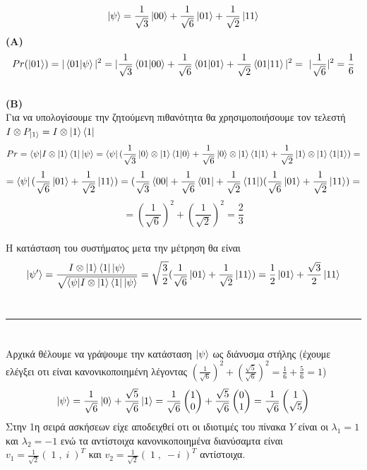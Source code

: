 \documentclass[12pt]{article}
\begin{document}
\section*{{}}
$$\ket{\psi} = \frac{1}{\sqrt{3}}\ket{00}+\frac{1}{\sqrt{6}}\ket{01}+\frac{1}{\sqrt{2}}\ket{11}$$
{\bf (A)}\\
$$Pr(\ket{01}) = |\braket{01|\psi}|^2 = |\frac{1}{\sqrt{3}}\braket{01|00}+\frac{1}{\sqrt{6}}\braket{01|01}+\frac{1}{\sqrt{2}}\braket{01|11}|^2 = \
|\frac{1}{\sqrt{6}}|^2 = \frac{1}{6}$$\\
{\bf (B)}\\
Για να υπολογίσουμε την ζητούμενη πιθανότητα θα χρησιμοποιήσουμε τον τελεστή $I\otimes P_{\ket{1}} = I\otimes \ket{1}\bra{1}$\\
$$Pr = \braket{\psi|I\otimes \ket{1}\bra{1}|\psi} = \bra{\psi}(\frac{1}{\sqrt{3}}\ket{0}\otimes\ket{1}\braket{1|0}+\frac{1}{\sqrt{6}}\ket{0}\otimes\ket{1}\braket{1|1}+\frac{1}{\sqrt{2}}\ket{1}\otimes\ket{1}\braket{1|1})=$$
$$=\bra{\psi}(\frac{1}{\sqrt{6}}\ket{01}+\frac{1}{\sqrt{2}}\ket{11}) = (\frac{1}{\sqrt{3}}\bra{00}+\frac{1}{\sqrt{6}}\bra{01}+\frac{1}{\sqrt{2}}\bra{11})(\frac{1}{\sqrt{6}}\ket{01}+\frac{1}{\sqrt{2}}\ket{11}) =$$
$$= (\frac{1}{\sqrt{6}})^2 + (\frac{1}{\sqrt{2}})^2 = \frac{2}{3}$$\\
Η κατάσταση του συστήματος μετα την μέτρηση θα είναι 
$$\ket{\psi'} = \frac{I\otimes \ket{1}\bra{1}\ket{\psi} }{\sqrt{\braket{\psi|I\otimes \ket{1}\bra{1}|\psi}}}= 
\sqrt{\frac{3}{2}}(\frac{1}{\sqrt{6}}\ket{01}+\frac{1}{\sqrt{2}}\ket{11}) = \frac{1}{2}\ket{01}+\frac{\sqrt{3}}{2}\ket{11}$$\\
\rule{\textwidth}{.5pt}
\section*{{\bfΆσκηση 6.5}}
Αρχικά θέλουμε να γράψουμε την κατάσταση $\ket{\psi}$ ως διάνυσμα στήλης (έχουμε ελέγξει οτι είναι κανονικοποιημένη λέγοντας $(\frac{1}{\sqrt{6}})^2 + (\frac{\sqrt{5}}{\sqrt{6}})^2 = \frac{1}{6} + \frac{5}{6}=1$)
$$\ket{\psi} = \frac{1}{\sqrt{6}}\ket{0}+\frac{\sqrt{5}}{\sqrt{6}}\ket{1} = \frac{1}{\sqrt{6}}\begin{pmatrix}1\\0\end{pmatrix}+\frac{\sqrt{5}}{\sqrt{6}}\begin{pmatrix}0\\1\end{pmatrix}=
 \frac{1}{\sqrt{6}}\begin{pmatrix}1\\\sqrt{5}\end{pmatrix}$$
 Στην 1η σειρά ασκήσεων είχε αποδειχθεί οτι οι ιδιοτιμές του πίνακα $Y$ είναι οι $\lambda_1=1$ και $\lambda_2=-1$ ενώ τα αντίστοιχα κανονικοποιημένα διανύσαμτα είναι
$v_1=\frac{1}{\sqrt{2}}(\;1\;,\;i\;)^T$ και $v_2=\frac{1}{\sqrt{2}}(\;1\;,\;-i\;)^T$ αντίστοιχα.
\end{document}
